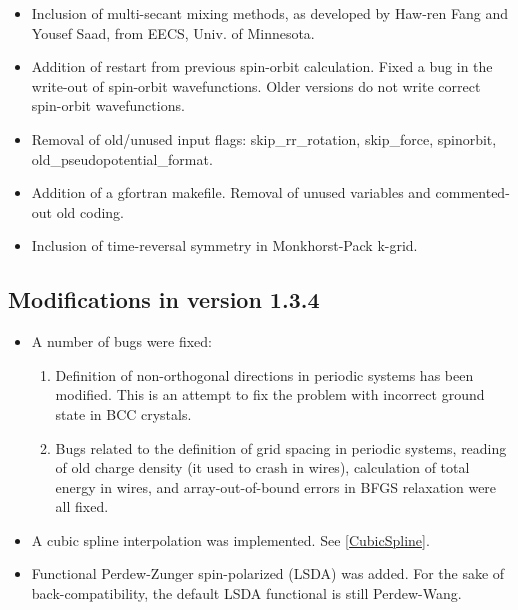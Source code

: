 \documentclass{article}
\begin{document}
\begin{itemize}
\item Inclusion of multi-secant mixing methods, as developed by Haw-ren Fang
and Yousef Saad, from EECS, Univ. of Minnesota.

\item Addition of restart from previous spin-orbit calculation. Fixed a bug
in the write-out of spin-orbit wavefunctions. Older versions do not write
correct spin-orbit wavefunctions.

\item Removal of old/unused input flags: skip\_rr\_rotation, skip\_force,
spinorbit, old\_pseudopotential\_format.

\item Addition of a gfortran makefile. Removal of unused variables and
commented-out old coding.

\item Inclusion of time-reversal symmetry in Monkhorst-Pack k-grid.
\end{itemize}

\subsection{Modifications in version 1.3.4}

\begin{itemize}
\item A number of bugs were fixed:

\begin{enumerate}
\item Definition of non-orthogonal directions in periodic systems has
  been modified. This is an attempt to fix the problem with incorrect
  ground state in BCC crystals.

\item Bugs related to the definition of grid spacing in periodic
  systems, reading of old charge density (it used to crash in wires),
  calculation of total energy in wires, and array-out-of-bound errors
  in BFGS relaxation were all fixed.
\end{enumerate}

\item A cubic spline interpolation was implemented. See
  \ref{CubicSpline}.

\item Functional Perdew-Zunger spin-polarized (LSDA) was added. For
  the sake of back-compatibility, the default LSDA functional is still
  Perdew-Wang.
\end{itemize}

\end{document}

